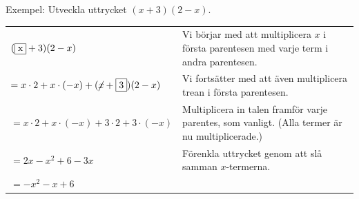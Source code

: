 Exempel: Utveckla uttrycket $(x+3)(2-x)$.

\smallskip
\begin{tabular}{l|p{5.7cm}}
  $(\framebox{x}+3)(2-x)$ & Vi börjar med att multiplicera $x$ i första parentesen med varje term i andra parentesen. \\
  $= x \cdot 2 + x \cdot (-x) + (\cancel{x} + \framebox{3})(2-x)$ &  Vi fortsätter med att även multiplicera trean i första parentesen. \\
  $= x \cdot 2 + x \cdot (-x) + 3 \cdot 2 + 3 \cdot (-x)$ & Multiplicera in talen framför varje parentes, som vanligt. (Alla termer är nu multiplicerade.) \\
  $= 2x - x^2 + 6 - 3x$ & Förenkla uttrycket genom att slå samman $x$-termerna. \\
  $=-x^2 - x + 6$ & \\
\end{tabular}
\smallskip
